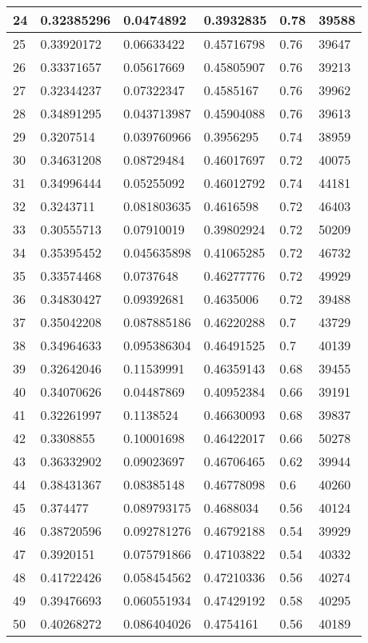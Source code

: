 \begin{longtable}{|l|l|l|l|l|l|}
24 & 0.32385296 & 0.0474892 & 0.3932835 & 0.78 & 39588 \\ \hline 
25 & 0.33920172 & 0.06633422 & 0.45716798 & 0.76 & 39647 \\ \hline 
26 & 0.33371657 & 0.05617669 & 0.45805907 & 0.76 & 39213 \\ \hline 
27 & 0.32344237 & 0.07322347 & 0.4585167 & 0.76 & 39962 \\ \hline 
28 & 0.34891295 & 0.043713987 & 0.45904088 & 0.76 & 39613 \\ \hline 
29 & 0.3207514 & 0.039760966 & 0.3956295 & 0.74 & 38959 \\ \hline 
30 & 0.34631208 & 0.08729484 & 0.46017697 & 0.72 & 40075 \\ \hline 
31 & 0.34996444 & 0.05255092 & 0.46012792 & 0.74 & 44181 \\ \hline 
32 & 0.3243711 & 0.081803635 & 0.4616598 & 0.72 & 46403 \\ \hline 
33 & 0.30555713 & 0.07910019 & 0.39802924 & 0.72 & 50209 \\ \hline 
34 & 0.35395452 & 0.045635898 & 0.41065285 & 0.72 & 46732 \\ \hline 
35 & 0.33574468 & 0.0737648 & 0.46277776 & 0.72 & 49929 \\ \hline 
36 & 0.34830427 & 0.09392681 & 0.4635006 & 0.72 & 39488 \\ \hline 
37 & 0.35042208 & 0.087885186 & 0.46220288 & 0.7 & 43729 \\ \hline 
38 & 0.34964633 & 0.095386304 & 0.46491525 & 0.7 & 40139 \\ \hline 
39 & 0.32642046 & 0.11539991 & 0.46359143 & 0.68 & 39455 \\ \hline 
40 & 0.34070626 & 0.04487869 & 0.40952384 & 0.66 & 39191 \\ \hline 
41 & 0.32261997 & 0.1138524 & 0.46630093 & 0.68 & 39837 \\ \hline 
42 & 0.3308855 & 0.10001698 & 0.46422017 & 0.66 & 50278 \\ \hline 
43 & 0.36332902 & 0.09023697 & 0.46706465 & 0.62 & 39944 \\ \hline 
44 & 0.38431367 & 0.08385148 & 0.46778098 & 0.6 & 40260 \\ \hline 
45 & 0.374477 & 0.089793175 & 0.4688034 & 0.56 & 40124 \\ \hline 
46 & 0.38720596 & 0.092781276 & 0.46792188 & 0.54 & 39929 \\ \hline 
47 & 0.3920151 & 0.075791866 & 0.47103822 & 0.54 & 40332 \\ \hline 
48 & 0.41722426 & 0.058454562 & 0.47210336 & 0.56 & 40274 \\ \hline 
49 & 0.39476693 & 0.060551934 & 0.47429192 & 0.58 & 40295 \\ \hline 
50 & 0.40268272 & 0.086404026 & 0.4754161 & 0.56 & 40189 \\ \hline 
\end{longtable}